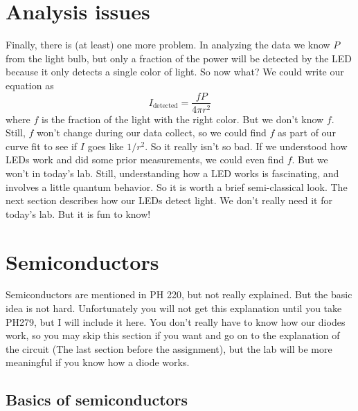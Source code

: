 \section{Analysis issues}

Finally, there is (at least) one more problem. In analyzing the data we know 
$P$ from the light bulb, but only a fraction of the power will be detected
by the LED because it only detects a single color of light. So now what? We
could write our equation as 
\begin{equation*}
	I_{\text{detected}}=\frac{fP}{4\pi r^{2}}
\end{equation*}%
where $f$ is the fraction of the light with the right color. But we don't
know $f.$ Still, $f$ won't change during our data collect, so we could find $%
f$ as part of our curve fit to see if $I$ goes like $1/r^{2}.$ So it really
isn't so bad. If we understood how LEDs work and did some prior
measurements, we could even find $f.$ But we won't in today's lab. Still,
understanding how a LED works is fascinating, and involves a little quantum
behavior. So it is worth a brief semi-classical look. The next section
describes how our LEDs detect light. We don't really need it for today's
lab. But it is fun to know!

\section{Semiconductors \label{Semiconductors}}

Semiconductors are mentioned in PH 220, but not really explained. But the
basic idea is not hard. Unfortunately you will not get this explanation
until you take PH279, but I will include it here. You don't really have to
know how our diodes work, so you may skip this section if you want and go on
to the explanation of the circuit (The last section before the assignment),
but the lab will be more meaningful if you know how a diode works.

\subsection{Basics of semiconductors}

